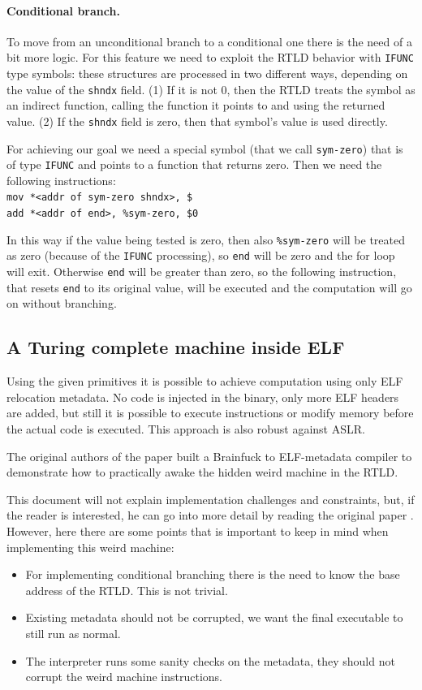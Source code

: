\documentclass[11pt,twoside,a4paper]{article}
\begin{document}
\paragraph{Conditional branch.} To move from an unconditional branch to a conditional one there is the need of a bit more logic. For this feature we need to exploit the RTLD behavior with \texttt{IFUNC} type symbols: these structures are processed in two different ways, depending on the value of the \texttt{shndx} field. (1) If it is not 0, then the RTLD treats the symbol as an indirect function, calling the function it points to and using the returned value. (2) If the \texttt{shndx} field is zero, then that symbol's value is used directly.

For achieving our goal we need a special symbol (that we call \texttt{sym-zero}) that is of type \texttt{IFUNC} and points to a function that returns zero. Then we need the following instructions:\\
\texttt{mov *<addr of sym-zero shndx>, \$<test val>} \\
\texttt{add *<addr of end>, \%sym-zero, \$0}

In this way if the value being tested is zero, then also \texttt{\%sym-zero} will be treated as zero (because of the \texttt{IFUNC} processing), so \texttt{end} will be zero and the for loop will exit. Otherwise \texttt{end} will be greater than zero, so the following instruction, that resets \texttt{end} to its original value, will be executed and the computation will go on without branching.


\subsection{A Turing complete machine inside ELF}

Using the given primitives it is possible to achieve computation using only ELF relocation metadata. No code is injected in the binary, only more ELF headers are added, but still it is possible to execute instructions or modify memory before the actual code is executed. This approach is also robust against ASLR.

The original authors of the paper built a Brainfuck to ELF-metadata compiler to demonstrate how to practically awake the hidden weird machine in the RTLD.

This document will not explain implementation challenges and constraints, but, if the reader is interested, he can go into more detail by reading the original paper \cite{elf_machine}. However, here there are some points that is important to keep in mind when implementing this weird machine:
\begin{itemize}
\item For implementing conditional branching there is the need to know the base address of the RTLD. This is not trivial.
\item Existing metadata should not be corrupted, we want the final executable to still run as normal.
\item The interpreter runs some sanity checks on the metadata, they should not corrupt the weird machine instructions.
\end{itemize}
\end{document}
